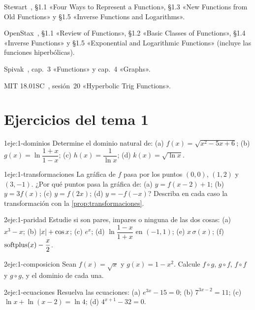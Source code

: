 \begin{lecturas}
\item Stewart~\cite{stewart}, §1.1 «Four Ways to Represent a Function», §1.3 «New Functions from Old Functions» y §1.5 «Inverse Functions and Logarithms».
\item OpenStax~\cite{osc1}, §1.1 «Review of Functions», §1.2 «Basic Classes of Functions», §1.4 «Inverse Functions» y §1.5 «Exponential and Logarithmic Functions» (incluye las funciones hiperbólicas).
\item Spivak~\cite{spivak}, cap.~3 «Functions» y cap.~4 «Graphs».
\item MIT 18.01SC~\cite{mit1801}, sesión~20 «Hyperbolic Trig Functions».
\end{lecturas}

\section*{Ejercicios del tema 1}

\begin{ejercicio}{1}{eje:1-dominios}
Determine el dominio natural de: (a) $f(x)=\sqrt{x^{2}-5x+6}$; (b) $g(x)=\ln\dfrac{1+x}{1-x}$; (c) $h(x)=\dfrac{1}{\ln x}$; (d) $k(x)=\sqrt{\ln x}$.
\end{ejercicio}

\begin{ejercicio}{1}{eje:1-transformaciones}
La gráfica de $f$ pasa por los puntos $(0,0)$, $(1,2)$ y $(3,-1)$. ¿Por qué puntos pasa la gráfica de: (a) $y=f(x-2)+1$; (b) $y=3f(x)$; (c) $y=f(2x)$; (d) $y=-f(-x)$? Describa en cada caso la transformación con la \cref{prop:transformaciones}.
\end{ejercicio}

\begin{ejercicio}{2}{eje:1-paridad}
Estudie si son pares, impares o ninguna de las dos cosas: (a) $x^{3}-x$; (b) $\lvert x\rvert+\cos x$; (c) $e^{x}$; (d) $\ln\dfrac{1-x}{1+x}$ en $(-1,1)$; (e) $x\,\sigma(x)$; (f) $\operatorname{softplus}(x)-\dfrac{x}{2}$.
\end{ejercicio}

\begin{ejercicio}{2}{eje:1-composicion}
Sean $f(x)=\sqrt{x}$ y $g(x)=1-x^{2}$. Calcule $f\circ g$, $g\circ f$, $f\circ f$ y $g\circ g$, y el dominio de cada una.
\end{ejercicio}

\begin{ejercicio}{2}{eje:1-ecuaciones}
Resuelva las ecuaciones: (a) $e^{3x}-15=0$; (b) $7^{3x-2}=11$; (c) $\ln x+\ln(x-2)=\ln 4$; (d) $4^{x+1}-32=0$.
\end{ejercicio}

